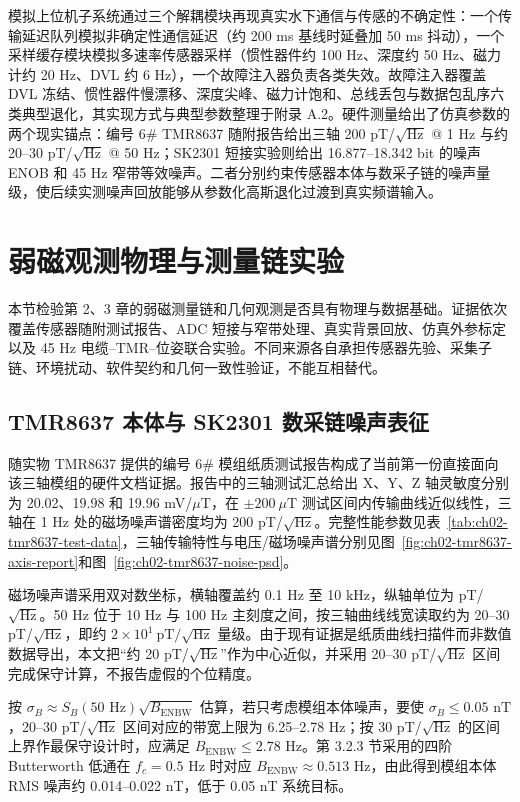 模拟上位机子系统通过三个解耦模块再现真实水下通信与传感的不确定性：一个传输延迟队列模拟非确定性通信延迟（约 200 ms 基线时延叠加 50 ms 抖动），一个采样缓存模块模拟多速率传感器采样（惯性器件约 100 Hz、深度约 50 Hz、磁力计约 20 Hz、DVL 约 6 Hz），一个故障注入器负责各类失效。故障注入器覆盖 DVL 冻结、惯性器件慢漂移、深度尖峰、磁力计饱和、总线丢包与数据包乱序六类典型退化，其实现方式与典型参数整理于附录 A.2。硬件测量给出了仿真参数的两个现实锚点：编号 6\# TMR8637 随附报告给出三轴 200 pT/\(\sqrt{\text{Hz}}\) @ 1 Hz 与约 20--30 pT/\(\sqrt{\text{Hz}}\) @ 50 Hz；SK2301 短接实验则给出 16.877--18.342 bit 的噪声 ENOB 和 45 Hz 窄带等效噪声。二者分别约束传感器本体与数采子链的噪声量级，使后续实测噪声回放能够从参数化高斯退化过渡到真实频谱输入。

\section{弱磁观测物理与测量链实验}\label{sec:ch05-magnetic-chain}

本节检验第 2、3 章的弱磁测量链和几何观测是否具有物理与数据基础。证据依次覆盖传感器随附测试报告、ADC 短接与窄带处理、真实背景回放、仿真外参标定以及 45 Hz 电缆--TMR--位姿联合实验。不同来源各自承担传感器先验、采集子链、环境扰动、软件契约和几何一致性验证，不能互相替代。

\subsection{TMR8637 本体与 SK2301 数采链噪声表征}\label{sec:ch05-5-3-2}

随实物 TMR8637 提供的编号 6\# 模组纸质测试报告构成了当前第一份直接面向该三轴模组的硬件文档证据。报告中的三轴测试汇总给出 X、Y、Z 轴灵敏度分别为 20.02、19.98 和 19.96 mV/\(\mu\)T，在 \(\pm200\ \mu\text{T}\) 测试区间内传输曲线近似线性，三轴在 1 Hz 处的磁场噪声谱密度均为 200 pT/\(\sqrt{\text{Hz}}\)。完整性能参数见表~\ref{tab:ch02-tmr8637-test-data}，三轴传输特性与电压/磁场噪声谱分别见图~\ref{fig:ch02-tmr8637-axis-report}和图~\ref{fig:ch02-tmr8637-noise-psd}。

磁场噪声谱采用双对数坐标，横轴覆盖约 0.1 Hz 至 10 kHz，纵轴单位为 pT/\(\sqrt{\text{Hz}}\)。50 Hz 位于 10 Hz 与 100 Hz 主刻度之间，按三轴曲线线宽读取约为 20--30 pT/\(\sqrt{\text{Hz}}\)，即约 \(2\times10^1\ \text{pT}/\sqrt{\text{Hz}}\) 量级。由于现有证据是纸质曲线扫描件而非数值数据导出，本文把``约 20 pT/\(\sqrt{\text{Hz}}\)''作为中心近似，并采用 20--30 pT/\(\sqrt{\text{Hz}}\) 区间完成保守计算，不报告虚假的个位精度。

按 \(\sigma_B\approx S_B(50\text{ Hz})\sqrt{B_{\mathrm{ENBW}}}\) 估算，若只考虑模组本体噪声，要使 \(\sigma_B\leq0.05\text{ nT}\)，20--30 pT/\(\sqrt{\text{Hz}}\) 区间对应的带宽上限为 6.25--2.78 Hz；按 30 pT/\(\sqrt{\text{Hz}}\) 的区间上界作最保守设计时，应满足 \(B_{\mathrm{ENBW}}\leq2.78\text{ Hz}\)。第 3.2.3 节采用的四阶 Butterworth 低通在 \(f_c=0.5\text{ Hz}\) 时对应 \(B_{\mathrm{ENBW}}\approx0.513\text{ Hz}\)，由此得到模组本体 RMS 噪声约 0.014--0.022 nT，低于 0.05 nT 系统目标。


